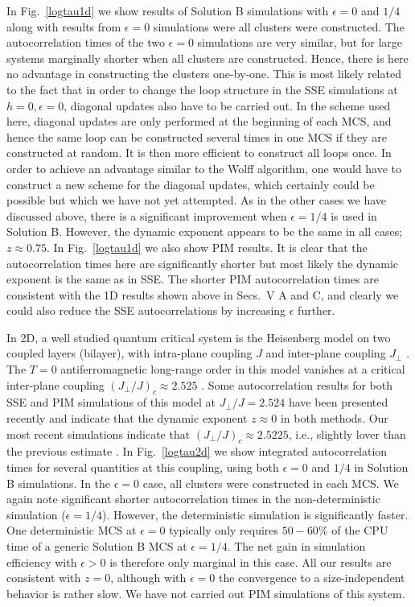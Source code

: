 \documentclass[10pt,pre,aps,twocolumn,showpacs,superscriptaddress,
floatfix]{revtex4}
\begin{document}
In Fig.~\ref{logtau1d} we show results of Solution B simulations with 
$\epsilon=0$ and $1/4$ along with results from $\epsilon=0$ simulations were 
all clusters were constructed. The autocorrelation times of the two 
$\epsilon=0$ simulations are very similar, but for large systems marginally 
shorter when all clusters are constructed. Hence, there is here no advantage 
in constructing the clusters one-by-one. This is most likely related to the 
fact that in order to change the loop structure in the SSE simulations at 
$h=0,\epsilon=0$, diagonal updates also have to be carried out. In the scheme 
used here, diagonal updates are only performed at the beginning of each MCS, 
and hence the same loop can be constructed several times in one MCS if they
are constructed at random. It is then more efficient to construct all loops 
once. In order to achieve an advantage similar to the Wolff algorithm, one 
would have to construct a new scheme for the diagonal updates, which certainly
could be possible but which we have not yet attempted. As in the other cases 
we have discussed above, there is a significant improvement when 
$\epsilon=1/4$ is used in Solution B. However, the dynamic exponent appears to
be the same in all cases; $z \approx 0.75$. In Fig.~\ref{logtau1d} we also 
show PIM results. It is clear that the autocorrelation times here are 
significantly shorter but most likely the dynamic exponent is the same as 
in SSE. The shorter PIM autocorrelation times are consistent with the 1D
results shown above in Secs.~V A and C, and clearly we could also reduce 
the SSE autocorrelations by increasing $\epsilon$ further.

In 2D, a well studied quantum critical system is the Heisenberg model on
two coupled layers (bilayer), with intra-plane coupling $J$ and inter-plane 
coupling $J_\perp$ \cite{hida}. The $T=0$ antiferromagnetic long-range order 
in this model vanishes at a critical inter-plane coupling $(J_\perp/J)_c 
\approx 2.525$ \cite{ssespin2}. Some autocorrelation results for both SSE 
and PIM simulations of this model at $J_\perp/J = 2.524$ have been presented 
recently \cite{dorneich2} and indicate that the dynamic exponent $z \approx 0$
in both methods. Our most recent simulations indicate that $(J_\perp/J)_c 
\approx 2.5225$, i.e., slightly lover than the previous estimate 
\cite{ssespin2}. In Fig.~\ref{logtau2d} we show integrated autocorrelation 
times for several quantities at this coupling, using both $\epsilon=0$ 
and $1/4$ in Solution B simulations. In the $\epsilon=0$ case, all clusters 
were constructed in each MCS. We again note significant shorter 
autocorrelation times in the non-deterministic simulation ($\epsilon =1/4$). 
However, the deterministic simulation is significantly faster. One 
deterministic MCS at $\epsilon =0$ typically only requires $50-60\%$ of the 
CPU time of a generic Solution B MCS at $\epsilon =1/4$. The net gain in 
simulation efficiency with $\epsilon > 0$ is therefore only marginal 
in this case. All our results are consistent with $z=0$, although with 
$\epsilon=0$ the convergence to a size-independent behavior is rather 
slow. We have not carried out PIM simulations of this system.
\end{document}
